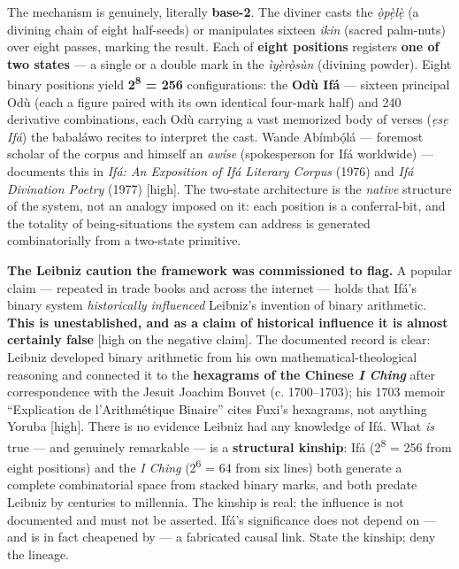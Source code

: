 \documentclass[11pt]{article}
\begin{document}
The mechanism is genuinely, literally \textbf{base-2}. The diviner casts the \emph{ọ̀pẹ̀lẹ̀} (a divining chain of eight half-seeds) or manipulates sixteen \emph{ikin} (sacred palm-nuts) over eight passes, marking the result. Each of \textbf{eight positions} registers \textbf{one of two states} — a single or a double mark in the \emph{ìyẹ̀rọ̀sùn} (divining powder). Eight binary positions yield \textbf{2\textsuperscript{8} = 256} configurations: the \textbf{Odù Ifá} — sixteen principal Odù (each a figure paired with its own identical four-mark half) and 240 derivative combinations, each Odù carrying a vast memorized body of verses (\emph{ẹsẹ Ifá}) the babaláwo recites to interpret the cast. Wande Abímbọ́lá — foremost scholar of the corpus and himself an \emph{awíse} (spokesperson for Ifá worldwide) — documents this in \emph{Ifá: An Exposition of Ifá Literary Corpus} (1976) and \emph{Ifá Divination Poetry} (1977) [high]. The two-state architecture is the \emph{native} structure of the system, not an analogy imposed on it: each position is a conferral-bit, and the totality of being-situations the system can address is generated combinatorially from a two-state primitive.

\textbf{The Leibniz caution the framework was commissioned to flag.} A popular claim — repeated in trade books and across the internet — holds that Ifá's binary system \emph{historically influenced} Leibniz's invention of binary arithmetic. \textbf{This is unestablished, and as a claim of historical influence it is almost certainly false} [high on the negative claim]. The documented record is clear: Leibniz developed binary arithmetic from his own mathematical-theological reasoning and connected it to the \textbf{hexagrams of the Chinese \emph{I Ching}} after correspondence with the Jesuit Joachim Bouvet (c. 1700–1703); his 1703 memoir ``Explication de l'Arithmétique Binaire'' cites Fuxi's hexagrams, not anything Yoruba [high]. There is no evidence Leibniz had any knowledge of Ifá. What \emph{is} true — and genuinely remarkable — is a \textbf{structural kinship}: Ifá (2\textsuperscript{8} = 256 from eight positions) and the \emph{I Ching} (2\textsuperscript{6} = 64 from six lines) both generate a complete combinatorial space from stacked binary marks, and both predate Leibniz by centuries to millennia. The kinship is real; the influence is not documented and must not be asserted. Ifá's significance does not depend on — and is in fact cheapened by — a fabricated causal link. State the kinship; deny the lineage.
\end{document}

